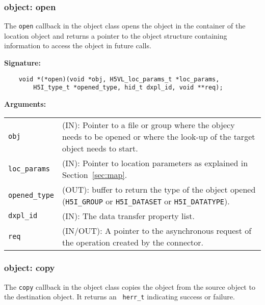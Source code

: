 \subsubsection{object: open}
The \texttt{open} callback in the object class opens the object in
the container of the location object and returns a pointer to the
object structure containing information to access the object in future
calls.\bigskip

\begin{mdframed}[style=bgbox]
\textbf{Signature:}
\begin{lstlisting}
    void *(*open)(void *obj, H5VL_loc_params_t *loc_params, 
        H5I_type_t *opened_type, hid_t dxpl_id, void **req);
\end{lstlisting}

\textbf{Arguments:}\\
\begin{tabular}{l p{13.5cm}}
  \texttt{obj} & (IN): Pointer to a file or group where the objecy needs to be
  opened or where the look-up of the target object needs to start.\\
  \texttt{loc\_params} & (IN): Pointer to location parameters as explained in
  Section~\ref{sec:map}.\\
  \texttt{opened\_type} & (OUT): buffer to return the type of the object
  opened (\texttt{H5I\_GROUP} or \texttt{H5I\_DATASET} or \texttt{H5I\_DATATYPE}).\\
  \texttt{dxpl\_id} & (IN): The data transfer property list.\\
  \texttt{req} & (IN/OUT): A pointer to the asynchronous request of the
  operation created by the connector.\\
\end{tabular}
\end{mdframed}

\subsubsection{object: copy}
The \texttt{copy} callback in the object class  copies the object
from the source object to the destination object. It returns an \texttt{
  herr\_t} indicating success or failure.\bigskip

